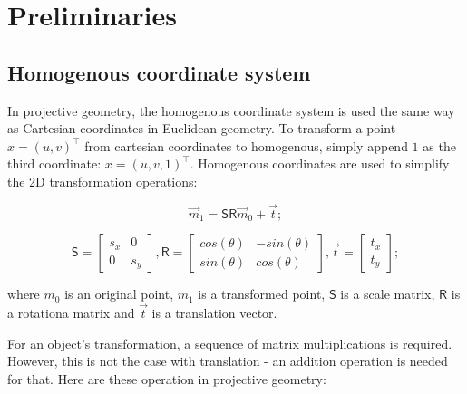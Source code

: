 \chapter{Preliminaries}

\label{chapter:preliminaries}
\section{Homogenous coordinate system}

In projective geometry, the homogenous coordinate system is used the same way as Cartesian coordinates in Euclidean geometry.
To transform a point $x=(u, v)^\top$ from cartesian coordinates to homogenous, simply append $1$ as the third coordinate: $x=(u, v, 1)^\top$.
Homogenous coordinates are used to simplify the 2D transformation operations: 


\begin{equation}
    \vec{m}_1 = 
    \pmb{\mathsf{S}} \pmb{\mathsf{R}}
    \vec{m}_0
    + \vec{t} ;
\end{equation}

\begin{equation}
    \pmb{\mathsf{S}} = \begin{bmatrix} s_x & 0 \\ 0 & s_y \end{bmatrix}, \pmb{\mathsf{R}} = \begin{bmatrix} cos(\theta) & -sin(\theta) \\ sin(\theta) & cos(\theta) \end{bmatrix}, \vec{t} = \begin{bmatrix} t_x \\ t_y \end{bmatrix} ;
\end{equation}

where $m_0$ is an original point,
$m_1$ is a transformed point,
$\pmb{\mathsf{S}}$ is a scale matrix,
$\pmb{\mathsf{R}}$ is a rotationa matrix and 
$\vec{t}$ is a translation vector.

For an object's transformation, a sequence of matrix multiplications is required. 
However, this is not the case with translation - an addition operation is needed for that. 
Here are these operation in projective geometry:

